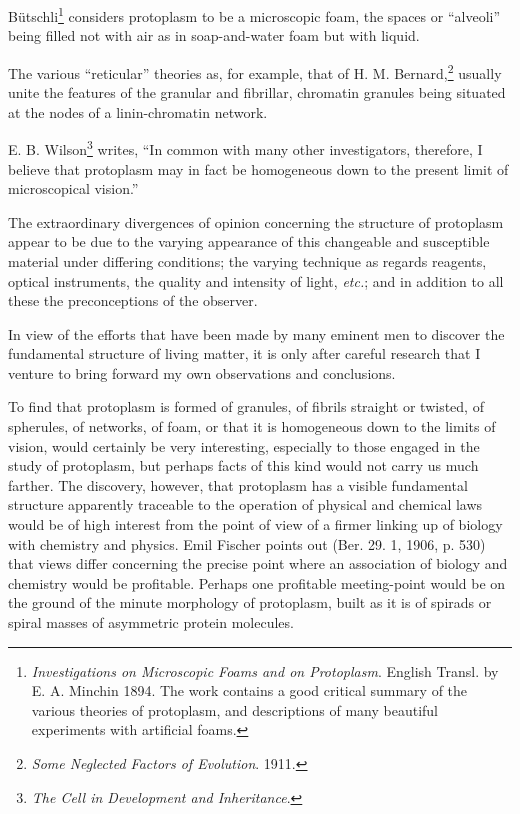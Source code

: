 \documentclass[a4paper, 12pt, oneside]{article}
\begin{document}
Bütschli\footnote{\emph{Investigations on Microscopic Foams and on Protoplasm}. English Transl. by E. A. Minchin 1894. The work contains a good critical summary of the various theories of protoplasm, and descriptions of many beautiful experiments with artificial foams.} considers protoplasm to be a microscopic foam, the spaces or ``alveoli'' being filled not with air as in soap-and-water foam but with liquid.

The various ``reticular'' theories as, for example, that of H. M. Bernard,\footnote{\emph{Some Neglected Factors of Evolution}. 1911.} usually unite the features of the granular and fibrillar, chromatin granules being situated at the nodes of a linin-chromatin network.

E. B. Wilson\footnote{\emph{The Cell in Development and Inheritance}.} writes, ``In common with many other investigators, therefore, I believe that protoplasm may in fact be homogeneous down to the present limit of microscopical vision.''

The extraordinary divergences of opinion concerning the structure of protoplasm appear to be due to the varying appearance of this changeable and susceptible material under differing conditions; the varying technique as regards reagents, optical instruments, the quality and intensity of light, \emph{etc.}; and in addition to all these the preconceptions of the observer.

In view of the efforts that have been made by many eminent men to discover the fundamental structure of living matter, it is only after careful research that I venture to bring forward my own observations and conclusions.

To find that protoplasm is formed of granules, of fibrils straight or twisted, of spherules, of networks, of foam, or that it is homogeneous down to the limits of vision, would certainly be very interesting, especially to those engaged in the study of protoplasm, but perhaps facts of this kind would not carry us much farther. The discovery, however, that protoplasm has a visible fundamental structure apparently traceable to the operation of physical and chemical laws would be of high interest from the point of view of a firmer linking up of biology with chemistry and physics. Emil Fischer points out (Ber. 29. 1, 1906, p. 530) that views differ concerning the precise point where an association of biology and chemistry would be profitable. Perhaps one profitable meeting-point would be on the ground of the minute morphology of protoplasm, built as it is of spirads or spiral masses of asymmetric protein molecules.
\end{document}
